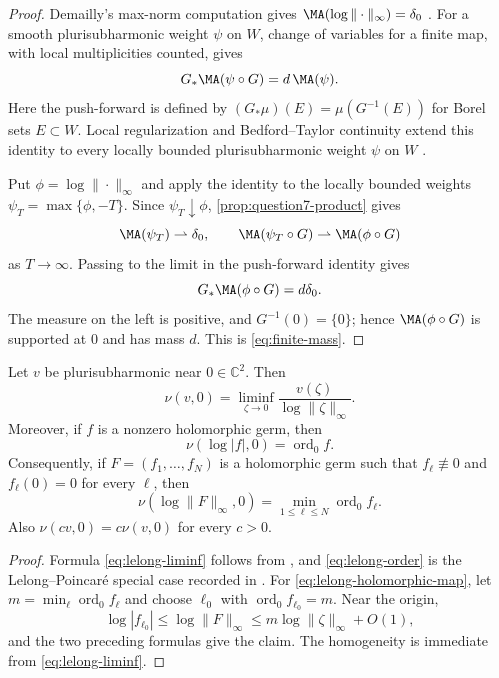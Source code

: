 \documentclass[11pt,a4paper]{article}
\begin{document}
\begin{proof}
Demailly's max-norm computation gives $\MA(\log\|\cdot\|_\infty)=\delta_0$ \cite[Chapter~III, Corollary~7.4]{DemaillyCADG}. For a smooth plurisubharmonic weight $\psi$ on $W$, change of variables for a finite map, with local multiplicities counted, gives
\[
  G_*\MA(\psi\circ G)=d\,\MA(\psi).
\]
Here the push-forward is defined by $(G_*\mu)(E)=\mu(G^{-1}(E))$ for Borel sets $E\subset W$.
Local regularization and Bedford--Taylor continuity extend this identity to every locally bounded plurisubharmonic weight $\psi$ on $W$ \cite[Chapter~III, Theorem~3.7]{DemaillyCADG}.

Put $\phi=\log\|\cdot\|_\infty$ and apply the identity to the locally bounded weights $\psi_T=\max\{\phi,-T\}$. Since $\psi_T\downarrow\phi$, \cref{prop:question7-product} gives
\[
  \MA(\psi_T)\rightharpoonup\delta_0, \qquad \MA(\psi_T\circ G)\rightharpoonup\MA(\phi\circ G)
\]
as $T\to\infty$. Passing to the limit in the push-forward identity gives
\[
  G_*\MA(\phi\circ G)=d\delta_0.
\]
The measure on the left is positive, and $G^{-1}(0)=\{0\}$; hence $\MA(\phi\circ G)$ is supported at $0$ and has mass $d$. This is \eqref{eq:finite-mass}.
\end{proof}

\begin{lemma}\label{lem:demailly-lelong}
Let $v$ be plurisubharmonic near $0\in\mathbb C^2$. Then
\begin{equation}\label{eq:lelong-liminf}
  \nu(v,0)=\liminf_{\zeta\to 0} \frac{v(\zeta)}{\log\|\zeta\|_\infty}.
\end{equation}
Moreover, if $f$ is a nonzero holomorphic germ, then
\begin{equation}\label{eq:lelong-order}
  \nu(\log|f|,0)=\operatorname{ord}_0 f.
\end{equation}
Consequently, if $F=(f_1,\ldots,f_N)$ is a holomorphic germ such that $f_\ell\not\equiv0$ and $f_\ell(0)=0$ for every $\ell$, then
\begin{equation}\label{eq:lelong-holomorphic-map}
  \nu(\log\|F\|_\infty,0)=\min_{1\le\ell\le N}\operatorname{ord}_0 f_\ell.
\end{equation}
Also $\nu(cv,0)=c\nu(v,0)$ for every $c>0$.
\end{lemma}

\begin{proof}
Formula \eqref{eq:lelong-liminf} follows from \cite[Chapter~III, formulas~(6.9c)--(6.9e) and Corollary~7.3]{DemaillyCADG}, and \eqref{eq:lelong-order} is the Lelong--Poincar\'e special case recorded in \cite[Chapter~III, \S6.10]{DemaillyCADG}. For \eqref{eq:lelong-holomorphic-map}, let $m=\min_\ell\operatorname{ord}_0 f_\ell$ and choose $\ell_0$ with $\operatorname{ord}_0 f_{\ell_0}=m$. Near the origin,
\[
  \log|f_{\ell_0}| \le \log\|F\|_\infty \le m\log\|\zeta\|_\infty+O(1),
\]
and the two preceding formulas give the claim. The homogeneity is immediate from \eqref{eq:lelong-liminf}.
\end{proof}
\end{document}
